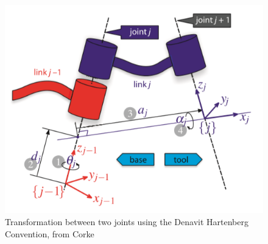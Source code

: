 \documentclass{UoNMCHA}
\numberwithin{equation}{section}
\begin{document}
\begin{figure}[ht]
	\begin{center}
		\includegraphics[width=.6\linewidth]{Figures/DH_photo}
		\caption{Transformation between two joints using the Denavit Hartenberg Convention, from Corke }
		\label{fig:DH_photo}
	\end{center}
\end{figure}
\end{document}
